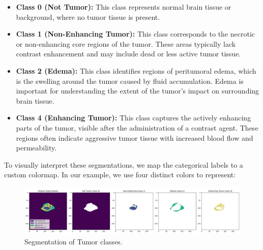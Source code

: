 \begin{itemize}
  \item \textbf{Class 0 (Not Tumor):} This class represents normal brain tissue or background, where no tumor tissue is present.
  \item \textbf{Class 1 (Non-Enhancing Tumor):} This class corresponds to the necrotic or non-enhancing core regions of the tumor. These areas typically lack contrast enhancement and may include dead or less active tumor tissue.
  \item \textbf{Class 2 (Edema):} This class identifies regions of peritumoral edema, which is the swelling around the tumor caused by fluid accumulation. Edema is important for understanding the extent of the tumor’s impact on surrounding brain tissue.
  \item \textbf{Class 4 (Enhancing Tumor):} This class captures the actively enhancing parts of the tumor, visible after the administration of a contrast agent. These regions often indicate aggressive tumor tissue with increased blood flow and permeability.
\end{itemize}

To visually interpret these segmentations, we map the categorical labels to a custom colormap. In our example, we use four distinct colors to represent:

\begin{figure}[H]
  \centering
  \includegraphics[width=1.1\textwidth]{Images/Chapter3/tclass.png}
  \caption{Segmentation of Tumor classes.}
  \label{fig:tclass}
\end{figure}

